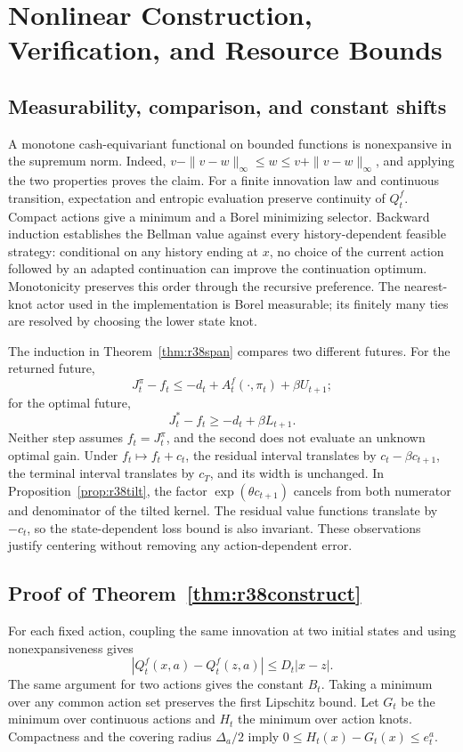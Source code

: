 \section{Nonlinear Construction, Verification, and Resource Bounds}
\label{sec:r38constructproof}

\subsection{Measurability, comparison, and constant shifts}
A monotone cash-equivariant functional on bounded functions is
nonexpansive in the supremum norm. Indeed, $v-\|v-w\|_\infty\leq w\leq
v+\|v-w\|_\infty$, and applying the two properties proves the claim. For a
finite innovation law and continuous transition, expectation and entropic
evaluation preserve continuity of $Q_t^f$. Compact actions give a minimum
and a Borel minimizing selector. Backward induction establishes the Bellman
value against every history-dependent feasible strategy: conditional on
any history ending at $x$, no choice of the current action followed by an
adapted continuation can improve the continuation optimum. Monotonicity
preserves this order through the recursive preference. The nearest-knot
actor used in the implementation is Borel measurable; its finitely many
ties are resolved by choosing the lower state knot.

The induction in Theorem~\ref{thm:r38span} compares two different futures.
For the returned future,
\[
 J_t^\pi-f_t\leq -d_t+A_t^f(\cdot,\pi_t)+\beta U_{t+1};
\]
for the optimal future,
\[
 J_t^*-f_t\geq -d_t+\beta L_{t+1}.
\]
Neither step assumes $f_t=J_t^\pi$, and the second does not evaluate an
unknown optimal gain. Under $f_t\mapsto f_t+c_t$, the residual interval
translates by $c_t-\beta c_{t+1}$, the terminal interval translates by $c_T$,
and its width is unchanged. In Proposition~\ref{prop:r38tilt}, the factor
$\exp(\theta c_{t+1})$ cancels from both numerator and denominator of the
tilted kernel. The residual value functions translate by $-c_t$, so the
state-dependent loss bound is also invariant. These observations justify
centering without removing any action-dependent error.

\subsection{Proof of Theorem~\ref{thm:r38construct}}
For each fixed action, coupling the same innovation at two initial states
and using nonexpansiveness gives
\[
 |Q_t^f(x,a)-Q_t^f(z,a)|\leq D_t|x-z|.
\]
The same argument for two actions gives the constant $B_t$. Taking a minimum
over any common action set preserves the first Lipschitz bound. Let $G_t$
be the minimum over continuous actions and $H_t$ the minimum over action
knots. Compactness and the covering radius $\Delta_a/2$ imply
$0\leq H_t(x)-G_t(x)\leq e_t^a$.

